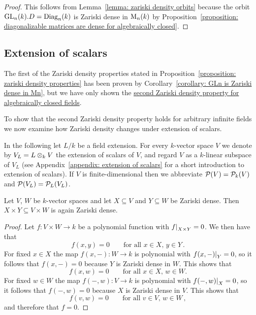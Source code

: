 \begin{proof}
  This follows from Lemma~\ref{lemma: zariski density orbits} because the orbit $\operatorname{GL}_n(k).D = \operatorname{Diag}_n(k)$ is Zariski dense in $\operatorname{M}_n(k)$ by Proposition~\ref{proposition: diagonalizable matrices are dense for algebraically closed}.
\end{proof}





\subsection*{Extension of scalars}


\begin{fluff}
  The first of the Zariski density properties stated in Proposition~\ref{proposition: zariski density properties} has been proven by Corollary~\ref{corollary: GLn is Zariski dense in Mn}, but we have only shown the \hyperref[corollary: second Zariski density property for algebraically closed fields]{second Zariski density property for algebraically closed fields}.
  
  To show that the second Zariski density property holds for arbitrary infinite fields we now examine how Zariski density changes under extension of scalars.
\end{fluff}


\begin{conventions}
  In the following let $L/k$ be a field extension.
  For every $k$-vector space $V$ we denote by $V_L = L \mathbin{\otimes}_k V$ the extension of scalars of $V$, and regard $V$ as a $k$-linear subspace of $V_L$ (see Appendix~\ref{appendix: extension of scalars} for a short introduction to extension of scalars).
  If $V$ is finite-dimensional then we abbreviate $\mathcal{P}(V) = \mathcal{P}_k(V)$ and $\mathcal{P}(V_L) = \mathcal{P}_L(V_L)$.
\end{conventions}


\begin{lemma}
  \label{lemma: product of Zariski dense is again Zariski dense}
  Let $V$, $W$ be $k$-vector spaces and let $X \subseteq V$ and $Y \subseteq W$ be Zariski dense.
  Then $X \times Y \subseteq V \times W$ is again Zariski dense.
\end{lemma}


\begin{proof}
  Let $f \colon V \times W \to k$ be a polynomial function with $\restrict{f}{X \times Y} = 0$.
  We then have that
  \[
      f(x,y)
    = 0
    \qquad
    \text{for all $x \in X$, $y \in Y$} \,.
  \]
  For fixed $x \in X$ the map $f(x,-) \colon W \to k$ is polynomial with $\restrict{f(x,-)}{Y} = 0$, so it follows that $f(x,-) = 0$ because $Y$ is Zariski dense in $W$.
  This shows that
  \[
      f(x,w)
    = 0
    \qquad
    \text{for all $x \in X$, $w \in W$}.
  \]
  For fixed $w \in W$ the map $f(-,w) \colon V \to k$ is polynomial with $\restrict{f(-,w)}{X} = 0$, so it follows that $f(-,w) = 0$ because $X$ is Zariski dense in $V$.
  This shows that
  \[
      f(v,w)
    = 0
    \qquad
    \text{for all $v \in V$, $w \in W$} \,,
  \]
  and therefore that $f = 0$.
\end{proof}


